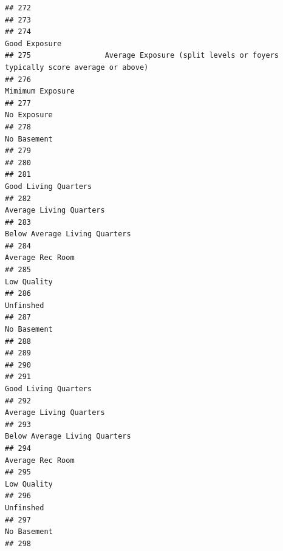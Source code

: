 \documentclass[
]{article}
\begin{document}
\begin{verbatim}
## 272                                                                                           
## 273                                                                                           
## 274                                                                              Good Exposure
## 275                 Average Exposure (split levels or foyers typically score average or above)
## 276                                                                           Mimimum Exposure
## 277                                                                                No Exposure
## 278                                                                                No Basement
## 279                                                                                           
## 280                                                                                           
## 281                                                                       Good Living Quarters
## 282                                                                    Average Living Quarters
## 283                                                              Below Average Living Quarters
## 284                                                                           Average Rec Room
## 285                                                                                Low Quality
## 286                                                                                  Unfinshed
## 287                                                                                No Basement
## 288                                                                                           
## 289                                                                                           
## 290                                                                                           
## 291                                                                       Good Living Quarters
## 292                                                                    Average Living Quarters
## 293                                                              Below Average Living Quarters
## 294                                                                           Average Rec Room
## 295                                                                                Low Quality
## 296                                                                                  Unfinshed
## 297                                                                                No Basement
## 298                                                                                           

\end{verbatim}
\end{document}
